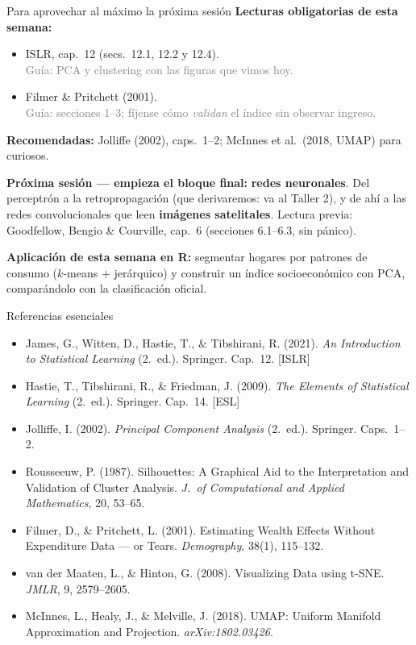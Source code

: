 \documentclass{beamer}
\newcommand{\1}{\mathbb{I}}
\begin{document}
\begin{frame}{Para aprovechar al máximo la próxima sesión}
\small
\textbf{Lecturas obligatorias de esta semana:}
\begin{itemize}\itemsep4pt
  \item ISLR, cap.\ 12 (secs.\ 12.1, 12.2 y 12.4). \\ \textcolor{gray}{Guía: PCA y clustering con las figuras que vimos hoy.}
  \item Filmer \& Pritchett (2001). \\ \textcolor{gray}{Guía: secciones 1--3; fíjense cómo \emph{validan} el índice sin observar ingreso.}
\end{itemize}

\textbf{Recomendadas:} Jolliffe (2002), caps.\ 1--2; McInnes et al.\ (2018, UMAP) para curiosos.
\pause

\vspace{0.2cm}
\textbf{Próxima sesión --- empieza el bloque final:} \textbf{redes neuronales}. Del perceptrón a la retropropagación (que derivaremos: va al Taller 2), y de ahí a las redes convolucionales que leen \textbf{imágenes satelitales}. Lectura previa: Goodfellow, Bengio \& Courville, cap.\ 6 (secciones 6.1--6.3, sin pánico).
\pause

\vspace{0.2cm}
\textbf{Aplicación de esta semana en R:} segmentar hogares por patrones de consumo ($k$-means $+$ jerárquico) y construir un índice socioeconómico con PCA, comparándolo con la clasificación oficial.
\end{frame}

\begin{frame}{Referencias esenciales}
\footnotesize
\begin{itemize}\itemsep2pt
  \item James, G., Witten, D., Hastie, T., \& Tibshirani, R. (2021). \emph{An Introduction to Statistical Learning} (2.\ ed.). Springer. Cap.\ 12. [ISLR]
  \item Hastie, T., Tibshirani, R., \& Friedman, J. (2009). \emph{The Elements of Statistical Learning} (2.\ ed.). Springer. Cap.\ 14. [ESL]
  \item Jolliffe, I. (2002). \emph{Principal Component Analysis} (2.\ ed.). Springer. Caps.\ 1--2.
  \item Rousseeuw, P. (1987). Silhouettes: A Graphical Aid to the Interpretation and Validation of Cluster Analysis. \emph{J.\ of Computational and Applied Mathematics}, 20, 53--65.
  \item Filmer, D., \& Pritchett, L. (2001). Estimating Wealth Effects Without Expenditure Data --- or Tears. \emph{Demography}, 38(1), 115--132.
  \item van der Maaten, L., \& Hinton, G. (2008). Visualizing Data using t-SNE. \emph{JMLR}, 9, 2579--2605.
  \item McInnes, L., Healy, J., \& Melville, J. (2018). UMAP: Uniform Manifold Approximation and Projection. \emph{arXiv:1802.03426}.
\end{itemize}
\normalsize
\end{frame}

\end{document}
